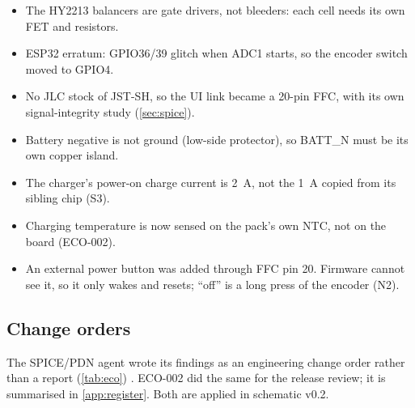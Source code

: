\begin{itemize}[itemsep=1pt]
  \item The HY2213 balancers are gate drivers, not bleeders: each cell needs its own FET and resistors.
  \item ESP32 erratum: GPIO36/39 glitch when ADC1 starts, so the encoder switch moved to GPIO4.
  \item No JLC stock of JST-SH, so the UI link became a 20-pin FFC, with its own signal-integrity study (\cref{sec:spice}).
  \item Battery negative is not ground (low-side protector), so BATT\_N must be its own copper island.
  \item The charger's power-on charge current is \qty{2}{\ampere}, not the \qty{1}{\ampere} copied from its sibling chip (S3).
  \item Charging temperature is now sensed on the pack's own NTC, not on the board (ECO-002).
  \item An external power button was added through FFC pin 20. Firmware cannot see it, so it only wakes and resets; ``off'' is a long press of the encoder (N2).
\end{itemize}

\subsection{Change orders}\label{sec:eco}

The SPICE/PDN agent wrote its findings as an engineering change order rather than a report (\cref{tab:eco}) . ECO-002 did the same for the release review; it is summarised in \cref{app:register}. Both are applied in schematic v0.2.

